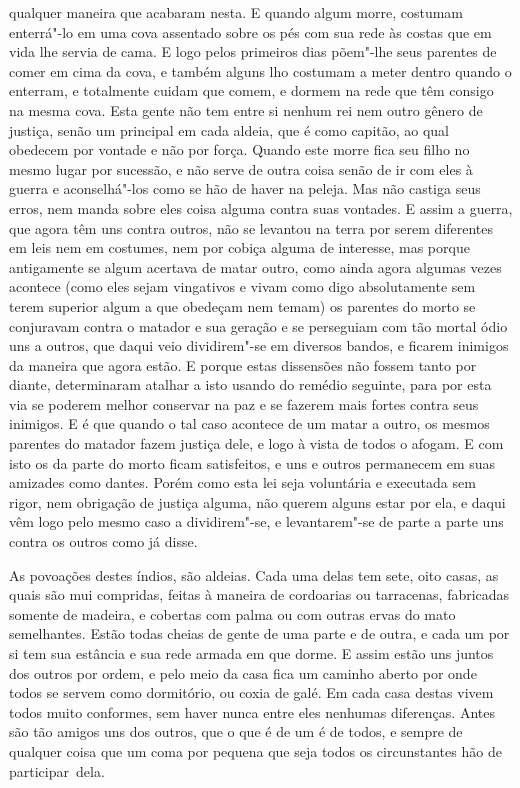 qualquer maneira que acabaram nesta. E quando algum morre, costumam
enterrá"-lo em uma cova assentado sobre os pés com sua rede às costas que
em vida lhe servia de cama. E logo pelos primeiros dias põem"-lhe seus
parentes de comer em cima da cova, e também alguns lho costumam a
meter dentro quando o enterram, e totalmente cuidam que comem, e dormem
na rede que têm consigo na mesma cova. Esta gente não tem entre si nenhum rei nem outro gênero de justiça, senão um
principal em cada aldeia, que é como capitão, ao qual obedecem por
vontade e não por força. Quando este morre fica seu filho no mesmo
lugar por sucessão, e não serve de outra coisa senão de ir com eles à
guerra e aconselhá"-los como se hão de haver na peleja. Mas não castiga
seus erros, nem manda sobre eles coisa alguma contra suas vontades. E
assim a guerra, que agora têm uns contra outros, não se levantou na terra
 por serem diferentes em leis nem em costumes, nem por cobiça alguma de
interesse, mas porque antigamente se algum acertava de matar outro,		%
como ainda agora algumas vezes acontece (como eles sejam vingativos e
vivam como digo absolutamente sem terem superior algum a que obedeçam
nem temam) os parentes do morto se conjuravam contra o matador e sua
geração e se perseguiam com tão mortal ódio uns a outros, que daqui
veio dividirem"-se em diversos bandos, e ficarem inimigos da maneira que
agora estão. E porque estas dissensões não fossem tanto por
diante, determinaram atalhar a isto usando do remédio seguinte, para
por esta via se poderem melhor conservar na paz e se fazerem mais
fortes contra seus inimigos. E é que quando o tal caso acontece de um
matar a outro, os mesmos parentes do matador fazem justiça dele, e logo		%
à vista de todos o afogam. E com isto os da parte do morto ficam
satisfeitos, e uns e outros permanecem em suas amizades como dantes.
Porém como esta lei seja voluntária e executada sem rigor, nem
obrigação de justiça alguma, não querem alguns estar por ela, e daqui
vêm logo pelo mesmo caso a dividirem"-se, e levantarem"-se de parte a
parte uns contra os outros como já disse.

As povoações destes índios, são aldeias. Cada uma delas tem sete, oito		%
casas, as quais são mui compridas, feitas à maneira de cordoarias ou
tarracenas, fabricadas somente de madeira, e cobertas com palma ou com
outras ervas do mato semelhantes. Estão todas cheias de gente de uma
parte e de outra, e cada um por si tem sua estância e sua rede armada em
que dorme. E assim estão uns juntos dos outros por ordem, e pelo meio da
casa fica um caminho aberto por onde todos se servem como dormitório,
ou coxia de galé. Em cada casa destas vivem todos muito conformes, sem
haver nunca entre eles nenhumas diferenças. Antes são tão amigos uns dos
outros, que o que é de um é de todos, e sempre de qualquer coisa que um
coma por pequena que seja todos os circunstantes hão de participar\mbox{ dela.}

